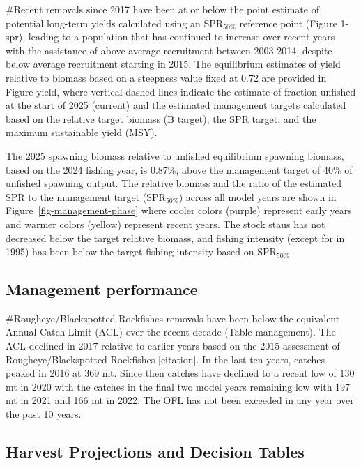 \documentclass[
]{scrartcl}
\begin{document}
\#Recent removals since 2017 have been at or below the point estimate of
potential long-term yields calculated using an \(\text{SPR}_{50\%}\)
reference point (Figure 1-spr), leading to a population that has
continued to increase over recent years with the assistance of above
average recruitment between 2003-2014, despite below average recruitment
starting in 2015. The equilibrium estimates of yield relative to biomass
based on a steepness value fixed at 0.72 are provided in Figure yield,
where vertical dashed lines indicate the estimate of fraction unfished
at the start of 2025 (current) and the estimated management targets
calculated based on the relative target biomass (B target), the SPR
target, and the maximum sustainable yield (MSY).

The 2025 spawning biomass relative to unfished equilibrium spawning
biomass, based on the 2024 fishing year, is 0.87\%, above the management
target of 40\% of unfished spawning output. The relative biomass and the
ratio of the estimated SPR to the management target
(\(\text{SPR}_{50\%}\)) across all model years are shown in
Figure~\ref{fig-management-phase} where cooler colors (purple) represent
early years and warmer colors (yellow) represent recent years. The stock
staus has not decreased below the target relative biomass, and fishing
intensity (except for in 1995) has been below the target fishing
intensity based on \(\text{SPR}_{50\%}\).

\subsection{Management performance}\label{management-performance-1}

\#Rougheye/Blackspotted Rockfishes removals have been below the
equivalent Annual Catch Limit (ACL) over the recent decade (Table
management). The ACL declined in 2017 relative to earlier years based on
the 2015 assessment of Rougheye/Blackspotted Rockfishes {[}citation{]}.
In the last ten years, catches peaked in 2016 at 369 mt. Since then
catches have declined to a recent low of 130 mt in 2020 with the catches
in the final two model years remaining low with 197 mt in 2021 and 166
mt in 2022. The OFL has not been exceeded in any year over the past 10
years.

\subsection{Harvest Projections and Decision
Tables}\label{harvest-projections-and-decision-tables-1}
\end{document}
